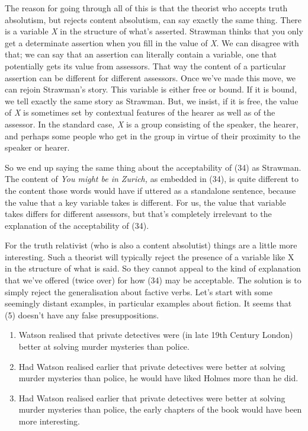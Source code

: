 \documentclass[
  11pt,
  letterpaper,
  DIV=11,
  numbers=noendperiod,
  twoside]{scrartcl}
\providecommand{\tightlist}{%
  \setlength{\itemsep}{0pt}\setlength{\parskip}{0pt}}
\begin{document}
The reason for going through all of this is that the theorist who
accepts truth absolutism, but rejects content absolutism, can say
exactly the same thing. There is a variable \emph{X} in the structure of
what's asserted. Strawman thinks that you only get a determinate
assertion when you fill in the value of \emph{X}. We can disagree with
that; we can say that an assertion can literally contain a variable, one
that potentially gets its value from assessors. That way the content of
a particular assertion can be different for different assessors. Once
we've made this move, we can rejoin Strawman's story. This variable is
either free or bound. If it is bound, we tell exactly the same story as
Strawman. But, we insist, if it is free, the value of \emph{X} is
sometimes set by contextual features of the hearer as well as of the
assessor. In the standard case, \emph{X} is a group consisting of the
speaker, the hearer, and perhaps some people who get in the group in
virtue of their proximity to the speaker or hearer.

So we end up saying the same thing about the acceptability of (34) as
Strawman. The content of \emph{You might be in Zurich,} as embedded in
(34), is quite different to the content those words would have if
uttered as a standalone sentence, because the value that a key variable
takes is different. For us, the value that variable takes differs for
different assessors, but that's completely irrelevant to the explanation
of the acceptability of (34).

For the truth relativist (who is also a content absolutist) things are a
little more interesting. Such a theorist will typically reject the
presence of a variable like X in the structure of what is said. So they
cannot appeal to the kind of explanation that we've offered (twice over)
for how (34) may be acceptable. The solution is to simply reject the
generalisation about factive verbs. Let's start with some seemingly
distant examples, in particular examples about fiction. It seems that
(5) doesn't have any false presuppositions.

\begin{enumerate}
\def\labelenumi{\arabic{enumi}.}
\setcounter{enumi}{4}
\tightlist
\item
  Watson realised that private detectives were (in late 19th Century
  London) better at solving murder mysteries than police.
\item
  Had Watson realised earlier that private detectives were better at
  solving murder mysteries than police, he would have liked Holmes more
  than he did.
\item
  Had Watson realised earlier that private detectives were better at
  solving murder mysteries than police, the early chapters of the book
  would have been more interesting.
\end{enumerate}
\end{document}
